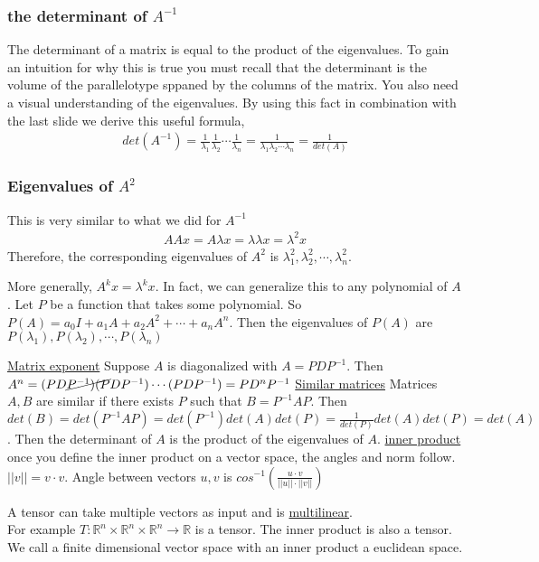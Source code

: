 \documentclass{beamer}
\theoremstyle{definition}
\renewcommand{\=}{&=&}
\newcommand{\<}{\langle}
\renewcommand{\>}{\rangle}
\begin{document}
\begin{frame}[t]
\frametitle{the determinant of $A^{-1}$}
The determinant of a matrix is equal to the product of the eigenvalues. To gain an
intuition for why this is true you must recall that the determinant is the
volume of the parallelotype sppaned by the columns of the matrix. You also need
a visual understanding of the eigenvalues. By using
this fact in combination with the last slide we derive this useful formula,
\begin{align*}
  det(A^{-1}) = \frac{1}{\lambda_1}\frac{1}{\lambda_2}\cdots\frac{1}{\lambda_n} = \frac{1}{\lambda_1\lambda_2\cdots\lambda_n} = \frac{1}{det(A)}
\end{align*}

\end{frame}
\begin{frame}[t]
\frametitle{Eigenvalues of $A^2$}
This is very similar to what we did for $A^{-1}$
\begin{align*}
  AAx = A \lambda x = \lambda \lambda x = \lambda^2 x
\end{align*}
Therefore, the corresponding eigenvalues of $A^2$ is $\lambda_1^2, \lambda_2^2, \cdots, \lambda_n^2$.

More generally, $A^k x = \lambda^k x$. In fact, we can generalize this to any
polynomial of $A$.
Let $P$ be a function that takes some polynomial.
So $P(A) = a_0 I + a_1A + a_2A^2 + \cdots + a_nA^n$.
Then the eigenvalues of $P(A)$ are $P(\lambda_1), P(\lambda_2), \cdots, P(\lambda_n)$
\end{frame}
\begin{frame}[t]


\underline{Matrix exponent}
Suppose $A$ is diagonalized with $A=PDP^{-1}$.
Then $A^n = (PD\cancel{P^{-1})(P}DP^{-1})\cdots(PDP^{-1}) = PD^nP^{-1}$
\underline{Similar matrices} Matrices $A, B$ are similar if there exists $P$
such that $B = P^{-1}AP$. Then $det(B) = det(P^{-1}AP) = det(P^{-1})det(A)det(P)
= \frac{1}{det(P)}det(A) det(P) = det(A)$. Then the determinant of $A$ is the
product of the eigenvalues of $A$.  
\underline{inner product}
once you define the inner product on a vector space, the angles and norm
follow. $||v|| = v \cdot v$. Angle between vectors $u, v$ is $cos^{-1}(\frac{u \cdot v}{||u|| \cdot ||v||})$

\end{frame}
\begin{frame}[t]
A tensor can take multiple vectors as input and is
\href{https://en.wikipedia.org/wiki/Multilinear_map}{multilinear}. \\
 For example $T: \mathbb{R}^n \times \mathbb{R}^n \times
\mathbb{R}^n \rightarrow \mathbb{R}$ is a tensor. The inner product is also a tensor.\\

We call a finite dimensional vector space with an inner product a euclidean
space.

\end{frame}
\end{document}
